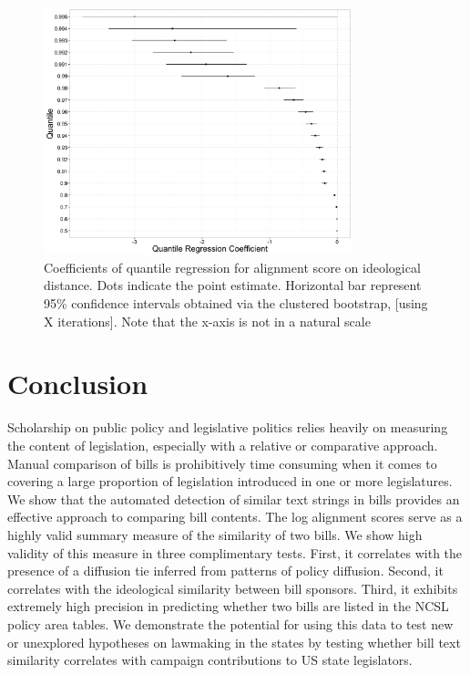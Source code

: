 \documentclass[12pt]{article} %
\begin{document}
\begin{figure}[ht!]
    \centering
    \includegraphics[width=0.8\textwidth]{figures/quantile_regression.png}
    \caption{Coefficients of quantile regression for alignment score on ideological distance. Dots indicate the point estimate. Horizontal bar represent 95\% confidence intervals obtained via the clustered bootstrap, [using X iterations]. Note that the x-axis is not in a natural scale}
    \label{fig:quantile_regression}
\end{figure}


\clearpage


\section{Conclusion}
Scholarship on public policy and legislative politics relies heavily on measuring the content of legislation, especially with a relative or comparative approach. Manual comparison of bills is prohibitively time consuming when it comes to covering a large proportion of legislation introduced in one or more legislatures. We show that the automated detection of similar text strings in bills provides an effective approach to comparing bill contents. The log alignment scores serve as a highly valid summary measure of the similarity of two bills. We show high validity of this measure in three complimentary tests. First, it correlates with the presence of a diffusion tie inferred from patterns of policy diffusion. Second, it correlates with the ideological similarity between bill sponsors. Third, it exhibits extremely high precision in predicting whether two bills are listed in the NCSL policy area tables. We demonstrate the potential for using this data to test new or unexplored hypotheses on lawmaking in the states by testing whether bill text similarity correlates with campaign contributions to US state legislators.
\end{document}
